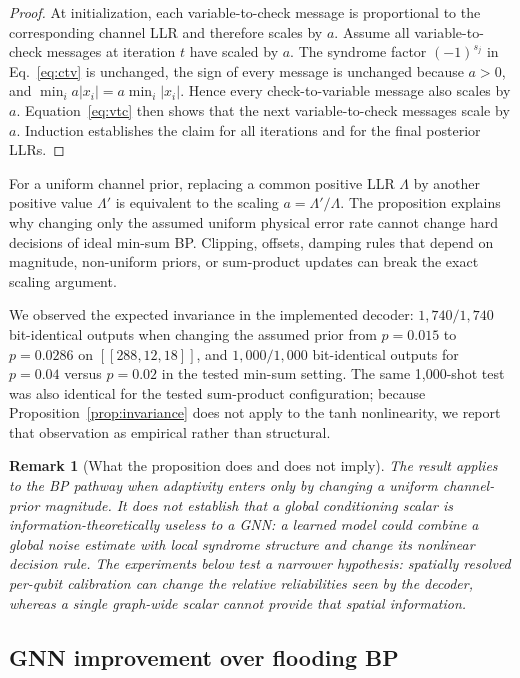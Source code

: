 \documentclass[a4paper,twocolumn,11pt,nopdfoutputerror]{quantumarticle}
\newcommand{\code}[3]{\ensuremath{[\![#1,#2,#3]\!]}}
\newtheorem{remark}{Remark}
\begin{document}
\begin{proof}
At initialization, each variable-to-check message is proportional to the
corresponding channel LLR and therefore scales by $a$. Assume all
variable-to-check messages at iteration $t$ have scaled by $a$. The
syndrome factor $(-1)^{s_j}$ in Eq.~\eqref{eq:ctv} is unchanged, the sign
of every message is unchanged because $a>0$, and
$\min_i a|x_i|=a\min_i|x_i|$. Hence every check-to-variable message also
scales by $a$. Equation~\eqref{eq:vtc} then shows that the next
variable-to-check messages scale by $a$. Induction establishes the claim
for all iterations and for the final posterior LLRs.
\end{proof}

For a uniform channel prior, replacing a common positive LLR $\Lambda$
by another positive value $\Lambda'$ is equivalent to the scaling
$a=\Lambda'/\Lambda$. The proposition explains why changing only the assumed uniform physical
error rate cannot change hard decisions of ideal min-sum BP. Clipping, offsets, damping rules that depend on
magnitude, non-uniform priors, or sum-product updates can break the exact
scaling argument.

We observed the expected invariance in the implemented decoder:
$1{,}740/1{,}740$ bit-identical outputs when changing the assumed prior
from $p=0.015$ to $p=0.0286$ on $\code{288}{12}{18}$, and
$1{,}000/1{,}000$ bit-identical outputs for $p=0.04$ versus $p=0.02$ in
the tested min-sum setting. The same 1{,}000-shot test was also identical
for the tested sum-product configuration; because Proposition~\ref{prop:invariance}
does not apply to the tanh nonlinearity, we report that observation as
empirical rather than structural.

\begin{remark}[What the proposition does and does not imply]
The result applies to the BP pathway when adaptivity enters only by
changing a uniform channel-prior magnitude. It does \emph{not} establish
that a global conditioning scalar is information-theoretically useless
to a GNN: a learned model could combine a global noise estimate with
local syndrome structure and change its nonlinear decision rule. The experiments below test a narrower hypothesis: spatially resolved
per-qubit calibration can change the relative reliabilities seen by the
decoder, whereas a single graph-wide scalar cannot provide that spatial
information.
\end{remark}

\subsection{GNN improvement over flooding BP}\label{sec:gnn_positive}
\end{document}
